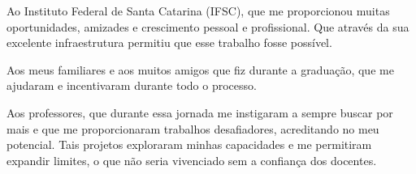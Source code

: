 \begin{agradecimentos}
	
	Ao Instituto Federal de Santa Catarina (IFSC), que me proporcionou muitas oportunidades, amizades e crescimento pessoal e profissional. Que através da sua excelente infraestrutura permitiu que esse trabalho fosse possível.
	
	Aos meus familiares e aos muitos amigos que fiz durante a graduação, que me ajudaram e incentivaram durante todo o processo. 
	
	Aos professores, que durante essa jornada me instigaram a sempre buscar por mais e que me proporcionaram trabalhos desafiadores, acreditando no meu potencial. Tais projetos exploraram minhas capacidades e me permitiram expandir limites, o que não seria vivenciado sem a confiança dos docentes.
	
	
\end{agradecimentos}